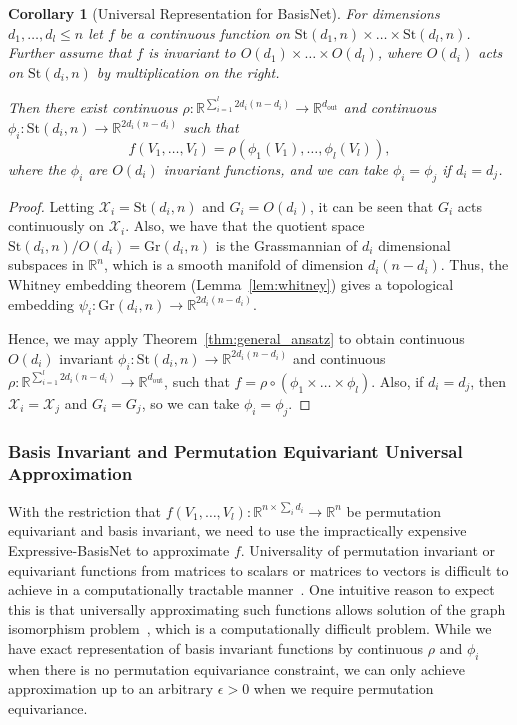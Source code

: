 \documentclass{article} \usepackage{iclr2023_conference,times}
\newcommand{\RR}{\mathbb R}
\newcommand{\mc}[1]{\mathcal{#1}}
\newcommand{\mrm}[1]{\mathrm{#1}}
\newcommand{\st}{\mrm{St}}
\newcommand{\gr}{\mrm{Gr}}
\renewcommand{\O}{O}
\newcommand{\dout}{d_{\mrm{out}}}
\newtheorem{corollary}{Corollary}
\begin{document}
\begin{corollary}[Universal Representation for BasisNet]\label{cor:universal_basisnet}
    For dimensions $d_1, \ldots, d_l \leq n$ let $f$ be a continuous function on $\st(d_1, n) \times  \ldots \times \st(d_l, n)$. Further assume that $f$ is invariant to $\O(d_1) \times \ldots \times \O(d_l)$, where $\O(d_i)$ acts on $\st(d_i, n)$ by multiplication on the right. 

    Then there exist continuous $\rho: \RR^{\sum_{i=1}^l 2d_i(n-d_i)} \to \RR^{\dout}$ and continuous $\phi_i: \st(d_i, n) \to \RR^{2d_i(n-d_i)}$ such that
    \begin{equation}
        f(V_1, \ldots, V_l) = \rho\left( \phi_1(V_1), \ldots, \phi_l(V_l) \right),
    \end{equation}
    where the $\phi_i$ are $\O(d_i)$ invariant functions, and we can take $\phi_i = \phi_j$ if $d_i = d_j$.
\end{corollary}
\begin{proof}
    Letting $\mc X_i = \st(d_i, n)$ and $G_i = \O(d_i)$, it can be seen that $G_i$ acts continuously on $\mc X_i$. Also, we have that the quotient space $\st(d_i, n) / \O(d_i) = \gr(d_i, n)$ is the Grassmannian of $d_i$ dimensional subspaces in $\RR^n$, which is a smooth manifold of dimension $d_i(n-d_i)$. Thus, the Whitney embedding theorem (Lemma~\ref{lem:whitney}) gives a topological embedding $\psi_i: \gr(d_i, n) \to \RR^{2d_i(n-d_i)}$.

    Hence, we may apply Theorem~\ref{thm:general_ansatz} to obtain continuous $\O(d_i)$ invariant $\phi_i: \st(d_i, n) \to \RR^{2d_i(n-d_i)}$ and continuous $\rho: \RR^{\sum_{i=1}^l 2d_i(n-d_i)} \to \RR^{\dout}$, such that $f = \rho \circ (\phi_1 \times \ldots \times \phi_l)$. Also, if $d_i = d_j$, then $\mc X_i = \mc X_j$ and $G_i = G_j$, so we can take $\phi_i = \phi_j$.

\end{proof}

\subsubsection{Basis Invariant and Permutation Equivariant Universal Approximation}

With the restriction that $f(V_1, \ldots, V_l): \RR^{n \times \sum_i d_i} \to \RR^n$ be permutation equivariant and basis invariant, we need to use the impractically expensive Expressive-BasisNet to approximate $f$. Universality of permutation invariant or equivariant functions from matrices to scalars or matrices to vectors is difficult to achieve in a computationally tractable manner~\citep{maron2019universality,keriven2019universal, maehara2019simple}. One intuitive reason to expect this is that universally approximating such functions allows solution of the graph isomorphism problem~\citep{chen2019equivalence}, which is a computationally difficult problem. While we have exact representation of basis invariant functions by continuous $\rho$ and $\phi_i$ when there is no permutation equivariance constraint, we can only achieve approximation up to an arbitrary $\epsilon > 0$ when we require permutation equivariance.
\end{document}
